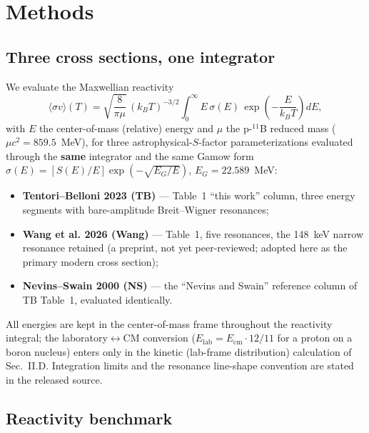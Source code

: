 \documentclass[aip,pop,reprint,amsmath,amssymb,floatfix]{revtex4-2}
\begin{document}
\section{Methods}

\subsection{Three cross sections, one integrator}

We evaluate the Maxwellian reactivity
\begin{equation}
\langle\sigma v\rangle(T)=\sqrt{\frac{8}{\pi\mu}}\,(k_BT)^{-3/2}\int_0^{\infty} E\,\sigma(E)\,\exp\!\left(-\frac{E}{k_BT}\right)dE,
\label{eq:reactivity}
\end{equation}
with $E$ the center-of-mass (relative) energy and $\mu$ the p-$^{11}$B reduced mass ($\mu c^2 = 859.5$~MeV), for three astrophysical-$S$-factor parameterizations evaluated through the \textbf{same} integrator and the same Gamow form $\sigma(E) = [S(E)/E]\exp(-\sqrt{E_G/E})$, $E_G = 22.589$~MeV:
\begin{itemize}
\item \textbf{Tentori--Belloni 2023 (TB)}\cite{tb} --- Table~1 ``this work'' column, three energy segments with bare-amplitude Breit--Wigner resonances;
\item \textbf{Wang et al. 2026 (Wang)}\cite{wang} --- Table~1, five resonances, the 148~keV narrow resonance retained (a preprint, not yet peer-reviewed; adopted here as the primary modern cross section);
\item \textbf{Nevins--Swain 2000 (NS)}\cite{ns} --- the ``Nevins and Swain'' reference column of TB Table~1, evaluated identically.\cite{noteNS}
\end{itemize}

All energies are kept in the center-of-mass frame throughout the reactivity integral; the laboratory$\leftrightarrow$CM conversion ($E_\mathrm{lab} = E_\mathrm{cm}\cdot 12/11$ for a proton on a boron nucleus) enters only in the kinetic (lab-frame distribution) calculation of Sec.~II.D. Integration limits and the resonance line-shape convention are stated in the released source.

\subsection{Reactivity benchmark}
\end{document}
